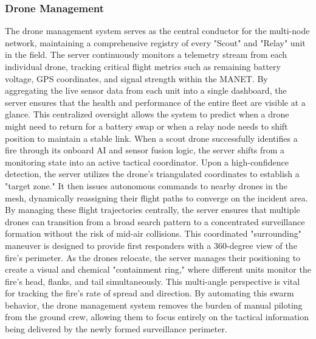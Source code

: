 \documentclass[journal, onecolumn]{IEEEtran}
\begin{document}
\vspace{0.5em}
\subsubsection{Drone Management}
The drone management system serves as the central conductor for the multi-node network, maintaining a comprehensive registry of every "Scout" and "Relay" unit in the field. The server continuously monitors a telemetry stream from each individual drone, tracking critical flight metrics such as remaining battery voltage, GPS coordinates, and signal strength within the MANET. By aggregating the live sensor data from each unit into a single dashboard, the server ensures that the health and performance of the entire fleet are visible at a glance. This centralized oversight allows the system to predict when a drone might need to return for a battery swap or when a relay node needs to shift position to maintain a stable link.
When a scout drone successfully identifies a fire through its onboard AI and sensor fusion logic, the server shifts from a monitoring state into an active tactical coordinator. Upon a high-confidence detection, the server utilizes the drone’s triangulated coordinates to establish a "target zone." It then issues autonomous commands to nearby drones in the mesh, dynamically reassigning their flight paths to converge on the incident area. By managing these flight trajectories centrally, the server ensures that multiple drones can transition from a broad search pattern to a concentrated surveillance formation without the risk of mid-air collisions.
This coordinated "surrounding" maneuver is designed to provide first responders with a 360-degree view of the fire’s perimeter. As the drones relocate, the server manages their positioning to create a visual and chemical "containment ring," where different units monitor the fire's head, flanks, and tail simultaneously. This multi-angle perspective is vital for tracking the fire’s rate of spread and direction. By automating this swarm behavior, the drone management system removes the burden of manual piloting from the ground crew, allowing them to focus entirely on the tactical information being delivered by the newly formed surveillance perimeter.

\vspace{0.5em}
\end{document}
